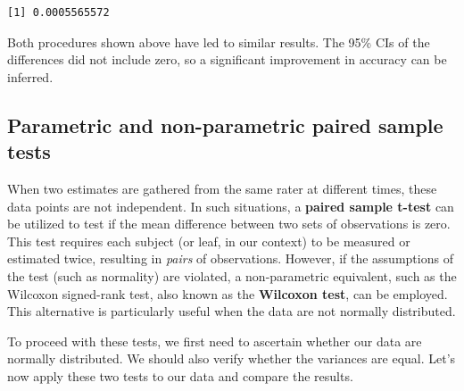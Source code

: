 \documentclass[
  letterpaper,
]{book}
\newenvironment{Shaded}{\begin{snugshade}}{\end{snugshade}}
\newcommand{\CommentTok}[1]{\textcolor[rgb]{0.37,0.37,0.37}{#1}}
\newcommand{\ControlFlowTok}[1]{\textcolor[rgb]{0.00,0.23,0.31}{#1}}
\newcommand{\FunctionTok}[1]{\textcolor[rgb]{0.28,0.35,0.67}{#1}}
\newcommand{\NormalTok}[1]{\textcolor[rgb]{0.00,0.23,0.31}{#1}}
\newcommand{\OtherTok}[1]{\textcolor[rgb]{0.00,0.23,0.31}{#1}}
\newcommand{\SpecialCharTok}[1]{\textcolor[rgb]{0.37,0.37,0.37}{#1}}
\begin{document}
\begin{Shaded}
\end{Shaded}

\begin{verbatim}
[1] 0.0005565572
\end{verbatim}

Both procedures shown above have led to similar results. The 95\% CIs of
the differences did not include zero, so a significant improvement in
accuracy can be inferred.

\hypertarget{parametric-and-non-parametric-paired-sample-tests}{%
\subsection{Parametric and non-parametric paired sample
tests}\label{parametric-and-non-parametric-paired-sample-tests}}

When two estimates are gathered from the same rater at different times,
these data points are not independent. In such situations, a
\textbf{paired sample t-test} can be utilized to test if the mean
difference between two sets of observations is zero. This test requires
each subject (or leaf, in our context) to be measured or estimated
twice, resulting in \emph{pairs} of observations. However, if the
assumptions of the test (such as normality) are violated, a
non-parametric equivalent, such as the Wilcoxon signed-rank test, also
known as the \textbf{Wilcoxon test}, can be employed. This alternative
is particularly useful when the data are not normally distributed.

To proceed with these tests, we first need to ascertain whether our data
are normally distributed. We should also verify whether the variances
are equal. Let's now apply these two tests to our data and compare the
results.

\begin{Shaded}
\end{Shaded}
\end{document}
